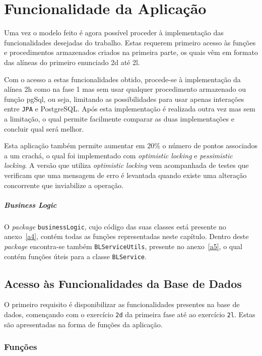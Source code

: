 %
%
\chapter{Funcionalidade da Aplicação} \label{cap3}

Uma vez o modelo feito é agora possível proceder à implementação das funcionalidades desejadas do trabalho. Estas requerem primeiro acesso às funções e procedimentos
armazenados criados na primeira parte, os quais vêm em formato das alíneas do primeiro enunciado 2d até 2l.

Com o acesso a estas funcionalidades obtido, procede-se à implementação da alínea 2h como na fase 1 mas sem usar qualquer procedimento armazenado ou função pgSql,
ou seja, limitando as possibilidades para usar apenas interações entre \texttt{JPA} e PostgreSQL. Após esta implementação é realizada outra vez mas sem a limitação,
o qual permite facilmente comparar as duas implementações e concluir qual será melhor.

Esta aplicação também permite aumentar em 20\% o número de pontos associados a um crachá, o qual foi implementado com \textit{optimistic locking} e \textit{pessimistic
locking}. A versão que utiliza \textit{optimistic locking} vem acompanhada de testes que verificam que uma mensagem de erro é levantada quando existe uma alteração
concorrente que inviabilize a operação.

\paragraph{Business Logic} O \textit{package} \texttt{businessLogic}, cujo código das suas classes está presente no anexo~\ref{a4}, contém todas as funções representadas
neste capítulo. Dentro deste \textit{package} encontra-se também \texttt{BLServiceUtils}, presente no anexo~\ref{a5}, o qual contém funções úteis para a classe
\texttt{BLService}.

%
%
\section{Acesso às Funcionalidades da Base de Dados} \label{sec31}

O primeiro requisito é disponibilizar as funcionalidades presentes na base de dados, començando com o exercício \texttt{2d} da primeira fase até ao exercício \texttt{2l}.
Estas são apresentadas na forma de funções da aplicação.

%
%
\subsection{Funções}\label{sec311}

